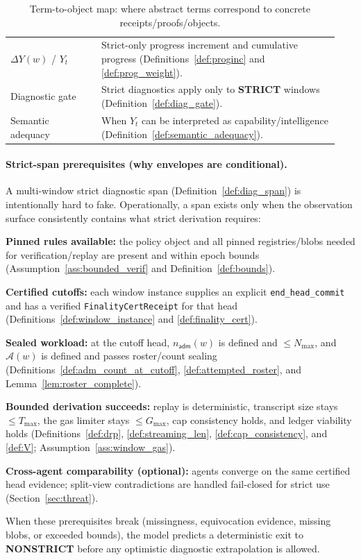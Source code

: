\documentclass[11pt]{article}
\newcommand{\code}[1]{\texttt{#1}}
\newcommand{\1}{\mathbf{1}}
\theoremstyle{definition}
\theoremstyle{plain}
\begin{document}
\begin{table}[H]
\begin{tabular}{p{0.26\linewidth} p{0.68\linewidth}}
$\Delta Y(w)$ / $Y_t$ & Strict-only progress increment and cumulative progress (Definitions~\ref{def:proginc} and \ref{def:prog_weight}). \\
Diagnostic gate & Strict diagnostics apply only to \textbf{STRICT} windows (Definition~\ref{def:diag_gate}). \\
Semantic adequacy & When $Y_t$ can be interpreted as capability/intelligence (Definition~\ref{def:semantic_adequacy}). \\
\bottomrule
\end{tabular}
\caption{Term-to-object map: where abstract terms correspond to concrete receipts/proofs/objects.}
\label{tab:term_object_map}
\end{table}

\paragraph{Strict-span prerequisites (why envelopes are conditional).}
A multi-window strict diagnostic span (Definition~\ref{def:diag_span}) is intentionally hard to fake.
Operationally, a span exists only when the observation surface consistently contains what strict derivation requires:
\begin{tightitemize}
\item \textbf{Pinned rules available:} the policy object and all pinned registries/blobs needed for verification/replay are present and within epoch bounds (Assumption~\ref{ass:bounded_verif} and Definition~\ref{def:bounds}).
\item \textbf{Certified cutoffs:} each window instance supplies an explicit \code{end\_head\_commit} and has a verified \code{FinalityCertReceipt} for that head (Definitions~\ref{def:window_instance} and \ref{def:finality_cert}).
\item \textbf{Sealed workload:} at the cutoff head, $n_{\textsf{adm}}(w)$ is defined and $\le N_{\max}$, and $\mathcal{A}(w)$ is defined and passes roster/count sealing (Definitions~\ref{def:adm_count_at_cutoff}, \ref{def:attempted_roster}, and Lemma~\ref{lem:roster_complete}).
\item \textbf{Bounded derivation succeeds:} replay is deterministic, transcript size stays $\le T_{\max}$, the gas limiter stays $\le G_{\max}$, cap consistency holds, and ledger viability holds (Definitions~\ref{def:drp}, \ref{def:streaming_len}, \ref{def:cap_consistency}, and \ref{def:V}; Assumption~\ref{ass:window_gas}).
\item \textbf{Cross-agent comparability (optional):} agents converge on the same certified head evidence; split-view contradictions are handled fail-closed for strict use (Section~\ref{sec:threat}).
\end{tightitemize}
When these prerequisites break (missingness, equivocation evidence, missing blobs, or exceeded bounds), the model predicts a deterministic exit to \textbf{NONSTRICT} before any optimistic diagnostic extrapolation is allowed.
\end{document}
